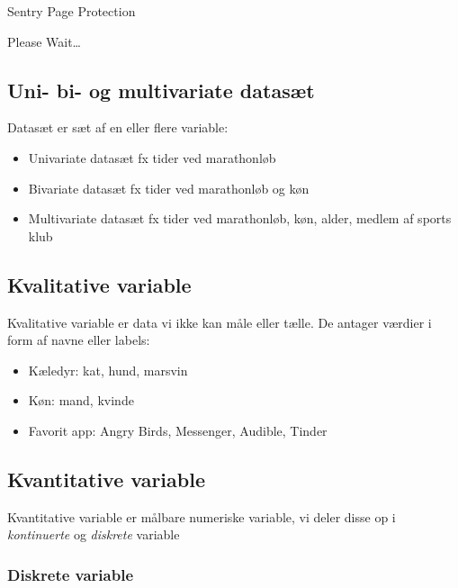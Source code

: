 \documentclass[]{book}
\providecommand{\tightlist}{%
  \setlength{\itemsep}{0pt}\setlength{\parskip}{0pt}}
\begin{document}
\hypertarget{Sentry_noJS}{}
Sentry Page Protection

\hypertarget{Sentry_redirecting}{}
Please Wait\ldots{}

\hypertarget{uni--bi--og-multivariate-datast}{%
\subsection{Uni- bi- og multivariate datasæt}\label{uni--bi--og-multivariate-datast}}

Datasæt er sæt af en eller flere variable:

\begin{itemize}
\tightlist
\item
  Univariate datasæt fx tider ved marathonløb\\
\item
  Bivariate datasæt fx tider ved marathonløb og køn
\item
  Multivariate datasæt fx tider ved marathonløb, køn, alder, medlem af sports klub
\end{itemize}

\hypertarget{kvalitative-variable}{%
\subsection{Kvalitative variable}\label{kvalitative-variable}}

Kvalitative variable er data vi ikke kan måle eller tælle. De antager værdier i form af navne eller labels:

\begin{itemize}
\tightlist
\item
  Kæledyr: kat, hund, marsvin
\item
  Køn: mand, kvinde
\item
  Favorit app: Angry Birds, Messenger, Audible, Tinder
\end{itemize}

\hypertarget{kvantitative-variable}{%
\subsection{Kvantitative variable}\label{kvantitative-variable}}

Kvantitative variable er målbare numeriske variable, vi deler disse op i \emph{kontinuerte} og \emph{diskrete} variable

\hypertarget{diskrete-variable}{%
\subsubsection{Diskrete variable}\label{diskrete-variable}}
\end{document}
